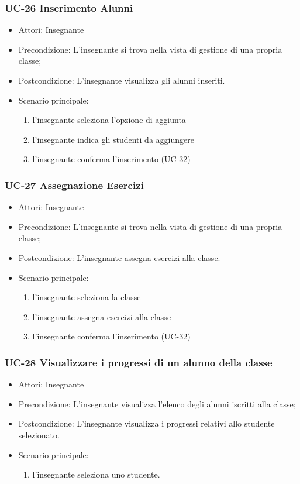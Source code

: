 \subsubsection{UC-26 Inserimento Alunni}
\begin{itemize}
	\item Attori: Insegnante
	\item Precondizione: L'insegnante si trova nella vista di gestione di una propria classe;
	\item Postcondizione: L'insegnante visualizza gli alunni inseriti.
	\item Scenario principale:
	\begin{enumerate}
		\item l'insegnante seleziona l'opzione di aggiunta
		\item l'insegnante indica gli studenti da aggiungere
		\item l'insegnante conferma l'inserimento (UC-32)
	\end{enumerate}
\end{itemize}

\subsubsection{UC-27 Assegnazione Esercizi}
\begin{itemize}
	\item Attori: Insegnante
	\item Precondizione: L'insegnante si trova nella vista di gestione di una propria classe;
	\item Postcondizione: L'insegnante assegna esercizi alla classe.
	\item Scenario principale:
	\begin{enumerate}
		\item l'insegnante seleziona la classe
		\item l'insegnante assegna esercizi alla classe
		\item l'insegnante conferma l'inserimento (UC-32)
	\end{enumerate}
\end{itemize}



\subsubsection{UC-28 Visualizzare i progressi di un alunno della classe}
\begin{itemize}
	\item Attori: Insegnante
	\item Precondizione: L'insegnante visualizza l'elenco degli alunni iscritti alla classe;
	\item Postcondizione: L'insegnante visualizza i progressi relativi allo studente selezionato.
	\item Scenario principale:
	\begin{enumerate}
		\item l'insegnante seleziona uno studente. 
	\end{enumerate}
\end{itemize}

